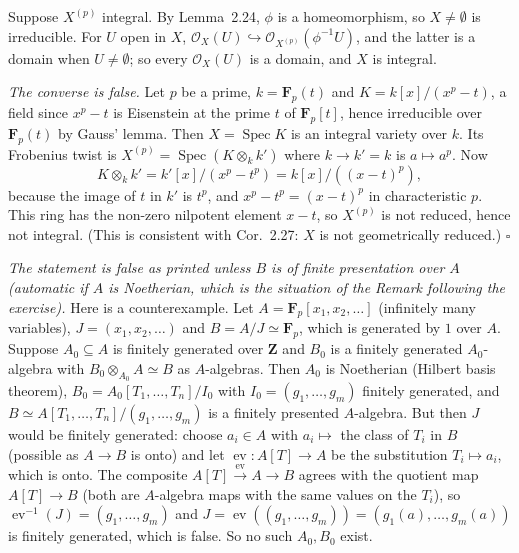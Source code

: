 \documentclass[11pt]{article}
\begin{document}
Suppose $X^{(p)}$ integral. By Lemma~2.24, $\phi$ is a homeomorphism, so $X\neq\emptyset$ is irreducible. For $U$ open in $X$, $\mathcal O_X(U)\hookrightarrow\mathcal O_{X^{(p)}}(\phi^{-1}U)$, and the latter is a domain when $U\neq\emptyset$; so every $\mathcal O_X(U)$ is a domain, and $X$ is integral.

\emph{The converse is false.} Let $p$ be a prime, $k=\mathbf F_p(t)$ and $K=k[x]/(x^p-t)$, a field since $x^p-t$ is Eisenstein at the prime $t$ of $\mathbf F_p[t]$, hence irreducible over $\mathbf F_p(t)$ by Gauss' lemma. Then $X=\operatorname{Spec}K$ is an integral variety over $k$. Its Frobenius twist is $X^{(p)}=\operatorname{Spec}(K\otimes_kk')$ where $k\to k'=k$ is $a\mapsto a^p$. Now
\[ K\otimes_kk'=k'[x]/(x^p-t^p)=k[x]/((x-t)^p), \]
because the image of $t$ in $k'$ is $t^p$, and $x^p-t^p=(x-t)^p$ in characteristic $p$. This ring has the non-zero nilpotent element $x-t$, so $X^{(p)}$ is not reduced, hence not integral. (This is consistent with Cor.~2.27: $X$ is not geometrically reduced.) \hfill$\square$

\pf
\emph{The statement is false as printed unless $B$ is of finite presentation over $A$ (automatic if $A$ is Noetherian, which is the situation of the Remark following the exercise).} Here is a counterexample. Let $A=\mathbf F_p[x_1,x_2,\dots]$ (infinitely many variables), $J=(x_1,x_2,\dots)$ and $B=A/J\simeq\mathbf F_p$, which is generated by $1$ over $A$. Suppose $A_0\subseteq A$ is finitely generated over $\mathbf Z$ and $B_0$ is a finitely generated $A_0$-algebra with $B_0\otimes_{A_0}A\simeq B$ as $A$-algebras. Then $A_0$ is Noetherian (Hilbert basis theorem), $B_0=A_0[T_1,\dots,T_n]/I_0$ with $I_0=(g_1,\dots,g_m)$ finitely generated, and $B\simeq A[T_1,\dots,T_n]/(g_1,\dots,g_m)$ is a finitely presented $A$-algebra. But then $J$ would be finitely generated: choose $a_i\in A$ with $a_i\mapsto$ the class of $T_i$ in $B$ (possible as $A\to B$ is onto) and let $\operatorname{ev}:A[T]\to A$ be the substitution $T_i\mapsto a_i$, which is onto. The composite $A[T]\xrightarrow{\operatorname{ev}}A\to B$ agrees with the quotient map $A[T]\to B$ (both are $A$-algebra maps with the same values on the $T_i$), so $\operatorname{ev}^{-1}(J)=(g_1,\dots,g_m)$ and $J=\operatorname{ev}((g_1,\dots,g_m))=(g_1(a),\dots,g_m(a))$ is finitely generated, which is false. So no such $A_0,B_0$ exist.
\end{document}
